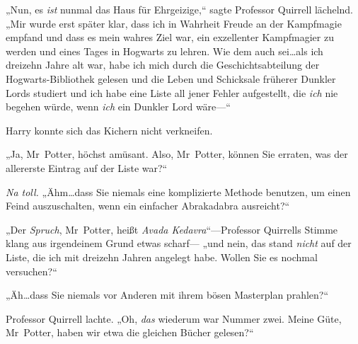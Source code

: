 „Nun, es \emph{ist} nunmal das Haus für Ehrgeizige,“ sagte Professor Quirrell lächelnd. „Mir wurde erst später klar, dass ich in Wahrheit Freude an der Kampfmagie empfand und dass es mein wahres Ziel war, ein exzellenter Kampfmagier zu werden und eines Tages in Hogwarts zu lehren. Wie dem auch sei…als ich dreizehn Jahre alt war, habe ich mich durch die Geschichtsabteilung der Hogwarts-Bibliothek gelesen und die Leben und Schicksale früherer Dunkler Lords studiert und ich habe eine Liste all jener Fehler aufgestellt, die \emph{ich} nie begehen würde, wenn \emph{ich} ein Dunkler Lord wäre—“

Harry konnte sich das Kichern nicht verkneifen.

„Ja, Mr~Potter, höchst amüsant. Also, Mr~Potter, können Sie erraten, was der allererste Eintrag auf der Liste war?“

\emph{Na toll.} „Ähm…dass Sie niemals eine komplizierte Methode benutzen, um einen Feind auszuschalten, wenn ein einfacher Abrakadabra ausreicht?“

„Der \emph{Spruch}, Mr~Potter, heißt \emph{Avada Kedavra}“—Professor Quirrells Stimme klang aus irgendeinem Grund etwas scharf— „und nein, das stand \emph{nicht} auf der Liste, die ich mit dreizehn Jahren angelegt habe. Wollen Sie es nochmal versuchen?“

„Äh…dass Sie niemals vor Anderen mit ihrem bösen Masterplan prahlen?“

Professor Quirrell lachte. „Oh, \emph{das} wiederum war Nummer zwei. Meine Güte, Mr~Potter, haben wir etwa die gleichen Bücher gelesen?“

